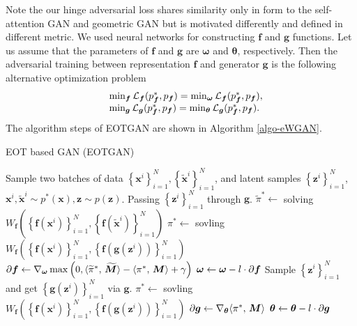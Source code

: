 Note the our hinge adversarial loss shares similarity only in form to the self-attention GAN\cite{2018arXiv180508318Z} and geometric GAN\cite{2017arXiv170502894L} but is motivated differently and defined in different metric. We used neural networks for constructing $\bm{f}$ and $\bm{g}$ functions. Let us assume that the parameters of $\bm{f}$ and $\bm{g}$ are $\bm{\omega}$ and $\bm{\theta}$, respectively. Then the adversarial training between representation $\bm{f}$ and
generator $\bm{g}$ is the following alternative optimization problem
\begin{equation}
  \begin{array}{rl}
    &\min_{\bm{f}} \Ll_{\bm{f}}(p^{\ast}_{\bm{f}}, p_{\bm{f}}) = \min_{\bm{\omega}} \Ll_{\bm{f}}(p^{\ast}_{\bm{f}}, p_{\bm{f}}), \\ 
    &\min_{\bm{g}}\Ll_{\bm{g}}(p^{\ast}_{\bm{f}}, p_{\bm{f}}) = \min_{\bm{\th}}\Ll_{\bm{g}}(p^{\ast}_{\bm{f}}, p_{\bm{f}}).
  \end{array}\vspace{-2pt}
\end{equation}
The algorithm steps of EOTGAN are shown in Algorithm \ref{algo-eWGAN}.

\begin{algorithm}[!t]
  \caption{EOT based GAN (EOTGAN)}\label{algo-eWGAN}
  \begin{algorithmic}[1]
    \STATE Sample two batches of data $ \left\{ \bm{x}^{i}
    \right\}_{i=1}^{N}, \left\{ \tilde{\bm{x}}^{i} \right\}_{i=1}^{N}  $,
    and latent samples $\left\{ \bm{z}^{i} \right\}_{i=1}^{N} $,
    $\bm{x}^{i},\tilde{\bm{x}}^{i} \sim p^{\ast}(\bm{x}), \bm{z}\sim p(\bm{z})$.
    \STATE Passing
    $\left\{ \bm{z}^{i} \right\}_{i=1}^{N}$ through $\bm{g}$.
    \STATE $\widetilde{\pi}^{\ast} \gets$ solving $ W_{\bm{f}}\left( \left\{ \bm{f}(\bm{x}^{i})
      \right\}_{i=1}^{N} , \left\{ \bm{f}(\tilde{\bm{x}}^{i})
      \right\}_{i=1}^{N}\right)$
    \STATE ${\pi}^{\ast} \gets$ sovling $W_{\bm{f}}\left( \left\{ \bm{f}(\bm{x}^{i})
      \right\}_{i=1}^{N}, \left\{ \bm{f}(\bm{g}(\bm{z}^i))
      \right\}_{i=1}^{N} \right)$
    \STATE $\partial{\bm{f}} \gets \nabla_{\bm{\omega}} \max\left(0,  \langle \widetilde{\pi}^{\ast},\,\widetilde{\bm{M}}\rangle-\langle {\pi^{\ast}},\,\bm{M}\rangle+ \gamma\right)$
    \STATE $\bm{\omega} \gets \bm{\omega} - l \cdot \partial{\bm{f}}$
    \STATE Sample $\left\{ \bm{z}^{i} \right\}_{i=1}^{N}$
    and get $ \left\{ \bm{g}(\bm{z}^i)\right\}_{i=1}^{N}$ via $\bm{g}$.
    \STATE $\pi^{\ast} \gets$ sovling $W_{\bm{f}}\left( \left\{ \bm{f}(\bm{x}^{i})
      \right\}_{i=1}^{N}, \left\{ \bm{f}(\bm{g}(\bm{z}^{i}))
      \right\}_{i=1}^{N} \right)$
    \STATE $\partial{\bm{g}} \gets \nabla_{\bm{\theta}} \langle \pi^{\ast},\,\bm{M}\rangle$
    \STATE $\bm{\theta} \gets \bm{\theta} -l \cdot \partial{\bm{g}}$
    \ENDWHILE
  \end{algorithmic}
\end{algorithm}

